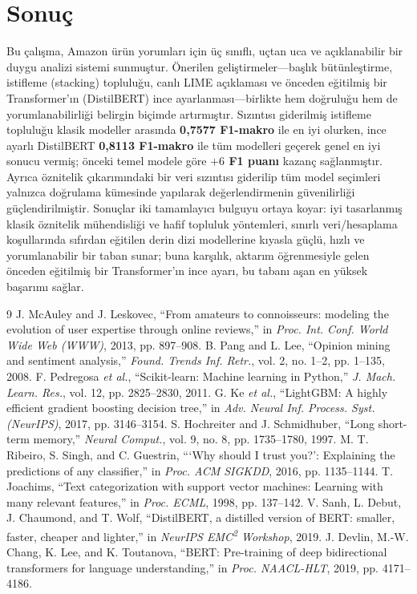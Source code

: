 \documentclass[conference]{IEEEtran}
\begin{document}
\section{Sonuç}
Bu çalışma, Amazon ürün yorumları için üç sınıflı, uçtan uca ve açıklanabilir bir
duygu analizi sistemi sunmuştur. Önerilen geliştirmeler---başlık bütünleştirme,
istifleme (stacking) topluluğu, canlı LIME açıklaması ve önceden eğitilmiş bir
Transformer'ın (DistilBERT) ince ayarlanması---birlikte hem doğruluğu hem de
yorumlanabilirliği belirgin biçimde artırmıştır. Sızıntısı giderilmiş istifleme
topluluğu klasik modeller arasında \textbf{0,7577 F1-makro} ile en iyi olurken,
ince ayarlı DistilBERT \textbf{0,8113 F1-makro} ile tüm modelleri geçerek genel en
iyi sonucu vermiş; önceki temel modele göre \textbf{$+6$ F1 puanı} kazanç
sağlanmıştır. Ayrıca öznitelik çıkarımındaki bir veri sızıntısı giderilip tüm model
seçimleri yalnızca doğrulama kümesinde yapılarak değerlendirmenin güvenilirliği
güçlendirilmiştir. Sonuçlar iki tamamlayıcı bulguyu ortaya koyar: iyi tasarlanmış
klasik öznitelik mühendisliği ve hafif topluluk yöntemleri, sınırlı veri/hesaplama
koşullarında sıfırdan eğitilen derin dizi modellerine kıyasla güçlü, hızlı ve
yorumlanabilir bir taban sunar; buna karşılık, aktarım öğrenmesiyle gelen önceden
eğitilmiş bir Transformer'ın ince ayarı, bu tabanı aşan en yüksek başarımı sağlar.

\begin{thebibliography}{9}
 J. McAuley and J. Leskovec, ``From amateurs to connoisseurs:
modeling the evolution of user expertise through online reviews,'' in
\emph{Proc. Int. Conf. World Wide Web (WWW)}, 2013, pp. 897--908.
 B. Pang and L. Lee, ``Opinion mining and sentiment analysis,''
\emph{Found. Trends Inf. Retr.}, vol. 2, no. 1--2, pp. 1--135, 2008.
 F. Pedregosa \emph{et al.}, ``Scikit-learn: Machine learning in
Python,'' \emph{J. Mach. Learn. Res.}, vol. 12, pp. 2825--2830, 2011.
 G. Ke \emph{et al.}, ``LightGBM: A highly efficient gradient
boosting decision tree,'' in \emph{Adv. Neural Inf. Process. Syst. (NeurIPS)},
2017, pp. 3146--3154.
 S. Hochreiter and J. Schmidhuber, ``Long short-term memory,''
\emph{Neural Comput.}, vol. 9, no. 8, pp. 1735--1780, 1997.
 M. T. Ribeiro, S. Singh, and C. Guestrin, ```Why should I trust
you?': Explaining the predictions of any classifier,'' in \emph{Proc. ACM SIGKDD},
2016, pp. 1135--1144.
 T. Joachims, ``Text categorization with support vector machines:
Learning with many relevant features,'' in \emph{Proc. ECML}, 1998, pp. 137--142.
 V. Sanh, L. Debut, J. Chaumond, and T. Wolf, ``DistilBERT, a
distilled version of BERT: smaller, faster, cheaper and lighter,'' in
\emph{NeurIPS EMC\textsuperscript{2} Workshop}, 2019.
 J. Devlin, M.-W. Chang, K. Lee, and K. Toutanova, ``BERT:
Pre-training of deep bidirectional transformers for language understanding,'' in
\emph{Proc. NAACL-HLT}, 2019, pp. 4171--4186.
\end{thebibliography}
\end{document}
